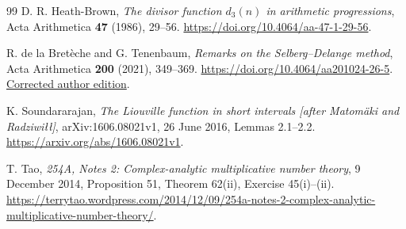 \begin{thebibliography}{99}
D. R. Heath-Brown,
\emph{The divisor function \(d_3(n)\) in arithmetic progressions},
Acta Arithmetica \textbf{47} (1986), 29--56.
\url{https://doi.org/10.4064/aa-47-1-29-56}.

R. de la Bret\`eche and G. Tenenbaum,
\emph{Remarks on the Selberg--Delange method},
Acta Arithmetica \textbf{200} (2021), 349--369.
\url{https://doi.org/10.4064/aa201024-26-5}.
\href{https://tenenb.perso.math.cnrs.fr/PPP/On-SD.pdf}{Corrected author edition}.

K. Soundararajan,
\emph{The Liouville function in short intervals
[after Matom\"aki and Radziwi\l\l]},
arXiv:1606.08021v1, 26 June 2016, Lemmas 2.1--2.2.
\url{https://arxiv.org/abs/1606.08021v1}.

T. Tao,
\emph{254A, Notes 2: Complex-analytic multiplicative number theory},
9 December 2014, Proposition 51, Theorem 62(ii),
Exercise 45(i)--(ii).
\url{https://terrytao.wordpress.com/2014/12/09/254a-notes-2-complex-analytic-multiplicative-number-theory/}.

\end{thebibliography}
